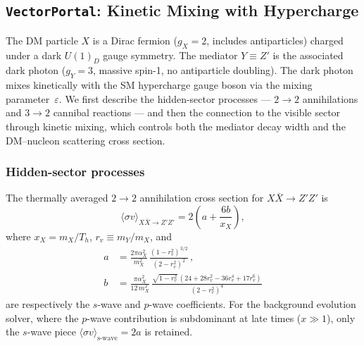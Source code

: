 \documentclass[11pt]{article}
\numberwithin{equation}{section}
\newcommand{\sigmav}{\langle\sigma v\rangle}
\newcommand{\TD}{T_h}
\newcommand{\mX}{m_X}
\newcommand{\mY}{m_Y}
\newcommand{\alphaX}{\alpha_X}
\newcommand{\epsX}{\varepsilon}
\begin{document}
\subsection{\texttt{VectorPortal}: Kinetic Mixing with Hypercharge}
\label{sec:VP}

The DM particle $X$ is a Dirac fermion ($g_X = 2$, includes antiparticles) charged under a dark $U(1)_D$ gauge symmetry. The mediator $Y \equiv Z'$ is the associated dark photon ($g_Y = 3$, massive spin-1, no antiparticle doubling). The dark photon mixes kinetically with the SM hypercharge gauge boson via the mixing parameter~$\epsX$. We first describe the hidden-sector processes --- $2\to2$ annihilations and $3\to2$ cannibal reactions --- and then the connection to the visible sector through kinetic mixing, which controls both the mediator decay width and the DM--nucleon scattering cross section.

\subsubsection{Hidden-sector processes}
\label{sec:VP_dark}

The thermally averaged $2\to2$ annihilation cross section for $X\bar{X}\to Z'Z'$ is
\begin{equation}
    \sigmav_{X\bar{X}\to Z'Z'} = 2\!\left(a + \frac{6b}{x_X}\right),
\end{equation}
where $x_X = \mX/\TD$, $r_v \equiv \mY/\mX$, and
\begin{align}
    a &= \frac{2\pi\alphaX^2}{\mX^2}\,\frac{(1 - r_v^2)^{3/2}}{(2 - r_v^2)^2}\,, \label{eq:VP_swave} \\
    b &= \frac{\pi\alphaX^2}{12\,\mX^2}\,\frac{\sqrt{1 - r_v^2}\,(24 + 28r_v^2 - 36r_v^4 + 17r_v^6)}{(2 - r_v^2)^4} \label{eq:VP_pwave}
\end{align}
are respectively the $s$-wave and $p$-wave coefficients. For the background evolution solver, where the $p$-wave contribution is subdominant at late times ($x \gg 1$), only the $s$-wave piece $\sigmav_{\text{s-wave}} = 2a$ is retained.
\end{document}
